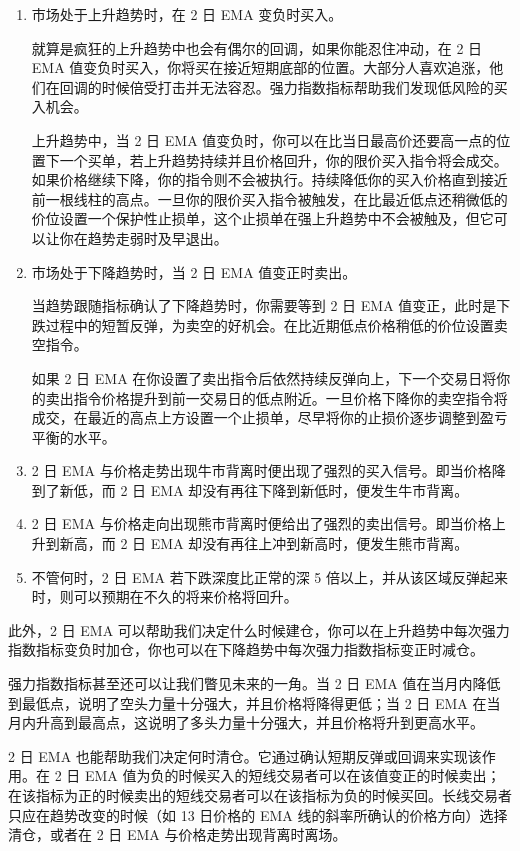 \begin{enumerate}
    \item 市场处于上升趋势时，在 2 日 EMA 变负时买入。

          就算是疯狂的上升趋势中也会有偶尔的回调，如果你能忍住冲动，在 2 日 EMA 值变负时买入，你将买在接近短期底部的位置。大部分人喜欢追涨，他们在回调的时候倍受打击并无法容忍。强力指数指标帮助我们发现低风险的买入机会。

          上升趋势中，当 2 日 EMA 值变负时，你可以在比当日最高价还要高一点的位置下一个买单，若上升趋势持续并且价格回升，你的限价买入指令将会成交。如果价格继续下降，你的指令则不会被执行。持续降低你的买入价格直到接近前一根线柱的高点。一旦你的限价买入指令被触发，在比最近低点还稍微低的价位设置一个保护性止损单，这个止损单在强上升趋势中不会被触及，但它可以让你在趋势走弱时及早退出。
    \item 市场处于下降趋势时，当 2 日 EMA 值变正时卖出。

          当趋势跟随指标确认了下降趋势时，你需要等到 2 日 EMA 值变正，此时是下跌过程中的短暂反弹，为卖空的好机会。在比近期低点价格稍低的价位设置卖空指令。

          如果 2 日 EMA 在你设置了卖出指令后依然持续反弹向上，下一个交易日将你的卖出指令价格提升到前一交易日的低点附近。一旦价格下降你的卖空指令将成交，在最近的高点上方设置一个止损单，尽早将你的止损价逐步调整到盈亏平衡的水平。
    \item 2 日 EMA 与价格走势出现牛市背离时便出现了强烈的买入信号。即当价格降到了新低，而 2 日 EMA 却没有再往下降到新低时，便发生牛市背离。
    \item 2 日 EMA 与价格走向出现熊市背离时便给出了强烈的卖出信号。即当价格上升到新高，而 2 日 EMA 却没有再往上冲到新高时，便发生熊市背离。
    \item 不管何时，2 日 EMA 若下跌深度比正常的深 5 倍以上，并从该区域反弹起来时，则可以预期在不久的将来价格将回升。
\end{enumerate}

此外，2 日 EMA 可以帮助我们决定什么时候建仓，你可以在上升趋势中每次强力指数指标变负时加仓，你也可以在下降趋势中每次强力指数指标变正时减仓。

强力指数指标甚至还可以让我们瞥见未来的一角。当 2 日 EMA 值在当月内降低到最低点，说明了空头力量十分强大，并且价格将降得更低；当 2 日 EMA 在当月内升高到最高点，这说明了多头力量十分强大，并且价格将升到更高水平。

2 日 EMA 也能帮助我们决定何时清仓。它通过确认短期反弹或回调来实现该作用。在 2 日 EMA 值为负的时候买入的短线交易者可以在该值变正的时候卖出；在该指标为正的时候卖出的短线交易者可以在该指标为负的时候买回。长线交易者只应在趋势改变的时候（如 13 日价格的 EMA 线的斜率所确认的价格方向）选择清仓，或者在 2 日 EMA 与价格走势出现背离时离场。
